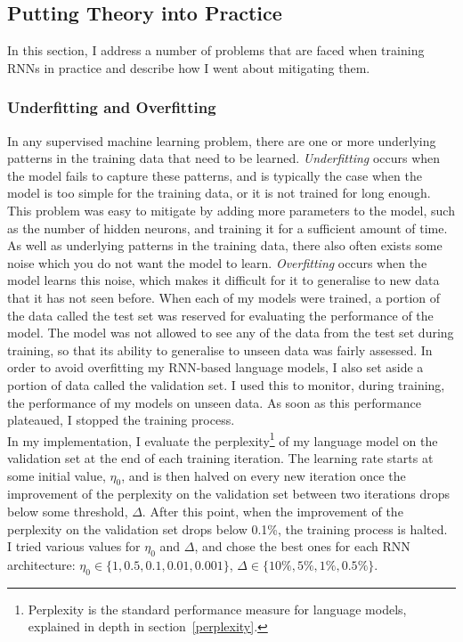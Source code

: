 \documentclass[a4paper, 12pt]{report}
\newcommand{\tit}[1]{\textit{#1}}
\begin{document}
\subsection{Putting Theory into Practice} \label{in_practice}

In this section, I address a number of problems that are faced when training RNNs in practice and describe how I went about mitigating them.

\subsubsection{Underfitting and Overfitting}
In any supervised machine learning problem, there are one or more underlying patterns in the training data that need to be learned. \tit{Underfitting} occurs when the model fails to capture these patterns, and is typically the case when the model is too simple for the training data, or it is not trained for long enough. This problem was easy to mitigate by adding more parameters to the model, such as the number of hidden neurons, and training it for a sufficient amount of time. \\

As well as underlying patterns in the training data, there also often exists some noise which you do not want the model to learn. \tit{Overfitting} occurs when the model learns this noise, which makes it difficult for it to generalise to new data that it has not seen before. When each of my models were trained, a portion of the data called the test set was reserved for evaluating the performance of the model. The model was not allowed to see any of the data from the test set during training, so that its ability to generalise to unseen data was fairly assessed. In order to avoid overfitting my RNN-based language models, I also set aside a portion of data called the validation set. I used this to monitor, during training, the performance of my models on unseen data. As soon as this performance plateaued, I stopped the training process. \\

In my implementation, I evaluate the perplexity\footnote{Perplexity is the standard performance measure for language models, explained in depth in section~\ref{perplexity}.} of my language model on the validation set at the end of each training iteration. The learning rate starts at some initial value, $\eta_0$, and is then halved on every new iteration once the improvement of the perplexity on the validation set between two iterations drops below some threshold, $\Delta$. After this point, when the improvement of the perplexity on the validation set drops below 0.1\%, the training process is halted. I tried various values for $\eta_0$ and $\Delta$, and chose the best ones for each RNN architecture: $\eta_0 \in \{1, 0.5, 0.1, 0.01, 0.001\}$, $\Delta \in \{10\%, 5\%, 1\%, 0.5\%\}$. \\
\end{document}
